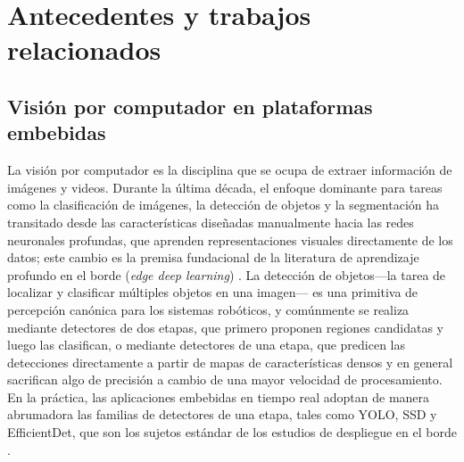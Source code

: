 %

\providecommand{\todo}[1]{\textbf{[TODO: #1]}}

\chapter{Antecedentes y trabajos relacionados}
\label{chap:background}

\section{Visión por computador en plataformas embebidas}
\label{sec:cv-embedded}

La visión por computador es la disciplina que se ocupa de extraer información
de imágenes y videos. Durante la última década, el enfoque dominante para
tareas como la clasificación de imágenes, la detección de objetos y la
segmentación ha transitado desde las características diseñadas manualmente
hacia las redes neuronales profundas, que aprenden representaciones visuales
directamente de los datos; este cambio es la premisa fundacional de la
literatura de aprendizaje profundo en el borde (\emph{edge deep learning})
\cite{xu2025}. La detección de objetos---la tarea de localizar y clasificar
múltiples objetos en una imagen--- es una primitiva de percepción canónica
para los sistemas robóticos, y comúnmente se realiza mediante detectores de
dos etapas, que primero proponen regiones candidatas y luego las clasifican,
o mediante detectores de una etapa, que predicen las detecciones directamente
a partir de mapas de características densos y en general sacrifican algo de
precisión a cambio de una mayor velocidad de procesamiento.
En la práctica, las aplicaciones embebidas en tiempo real adoptan de manera
abrumadora las familias de detectores de una etapa, tales como YOLO, SSD y
EfficientDet, que son los sujetos estándar de los estudios de despliegue en
el borde \cite{alqahtani2026, szegedi2026, zequn2026}.

